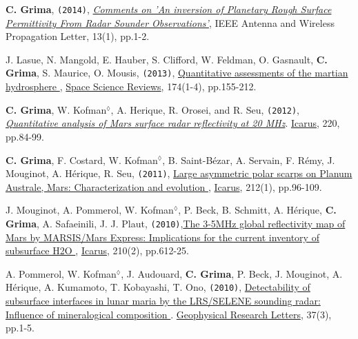 \begin{etaremune}
\item
  \textbf{C. Grima}, \texttt{(2014)}, \emph{\href{http://ieeexplore.ieee.org/xpl/articleDetails.jsp?tp=\&arnumber=6827185\&queryText\%3Dgrima}{Comments on 'An inversion of Planetary Rough Surface Permittivity From Radar Sounder Observations'}}, IEEE Antenna and Wireless Propagation Letter, 13(1), pp.1-2.
  
\item
  J. Lasue, N. Mangold, E. Hauber, S. Clifford, W. Feldman, O. Gasnault, \textbf{C. Grima}, S. Maurice, O. Mousis, \texttt{(2013)},
  \href{https://link.springer.com/article/10.1007/s11214-012-9946-5}{Quantitative assessments of the martian hydrosphere \aiOpenAccessSquare}, \ul{Space Science Reviews}, 174(1-4), pp.155-212.
  
\item
  \textbf{C. Grima}, W. Kofman$^\lozenge$, A. Herique, R. Orosei, and R. Seu, \texttt{(2012)}, \href{http://www.sciencedirect.com/science/article/pii/S0019103512001558}{\emph{Quantitative analysis of Mars surface radar reflectivity at 20 MHz}}. \ul{Icarus}, 220, pp.84-99.
  
\item
  \textbf{C. Grima}, F. Costard, W. Kofman$^\lozenge$, B. Saint-Bézar, A. Servain, F. Rémy, J. Mouginot, A. Hérique, R. Seu, \texttt{(2011)}, \href{http://www.sciencedirect.com/science/article/pii/S0019103510004859}{Large asymmetric polar scarps on Planum Australe, Mars: Characterization and evolution \aiOpenAccessSquare}, \ul{Icarus}, 212(1), pp.96-109.

\item
  J. Mouginot, A. Pommerol, W. Kofman$^\lozenge$, P. Beck, B. Schmitt, A. Hérique, \textbf{C. Grima}, A. Safaeinili, J. J. Plaut, \texttt{(2010)},\href{https://www.sciencedirect.com/science/article/pii/S0019103510002757}{The 3-5MHz global reflectivity map of Mars by MARSIS/Mars Express: Implications for the current inventory of subsurface H2O  \aiOpenAccessSquare}, \ul{Icarus}, 210(2), pp.612-25.

\item
  A. Pommerol, W. Kofman$^\lozenge$, J. Audouard, \textbf{C. Grima}, P. Beck, J. Mouginot, A. Hérique,  A. Kumamoto, T. Kobayashi, T. Ono, \texttt{(2010)}, \href{http://onlinelibrary.wiley.com/doi/10.1029/2009GL041681/abstract}{Detectability of subsurface interfaces in lunar maria by the LRS/SELENE sounding radar: Influence of mineralogical composition  \aiOpenAccessSquare}. \ul{Geophysical Research Letters}, 37(3), pp.1-5.
  

\end{etaremune}
